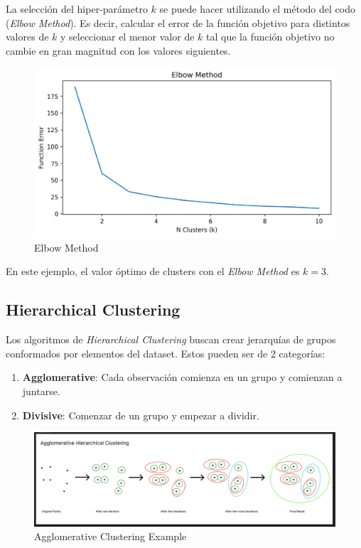 La selección del hiper-parámetro $k$ se puede hacer utilizando el método del codo (\textit{Elbow Method}). Es decir, calcular el error de la función objetivo para distintos valores de $k$ y seleccionar el menor valor de $k$ tal que la función objetivo no cambie en gran magnitud con los valores siguientes. 

\begin{figure}[H]
    \center
    \includegraphics[scale=0.45]{notebooks/ML/img/elbow_method_k_means.png}
    \caption{Elbow Method}
\end{figure}

En este ejemplo, el valor óptimo de clusters con el \textit{Elbow Method} es $k=3$.  

\subsection{Hierarchical Clustering}

Los algoritmos de \textit{Hierarchical Clustering} buscan crear jerarquías de grupos conformados por elementos del dataset. Estos pueden ser de 2 categorías: 

\begin{enumerate}
    \item \textbf{Agglomerative}: Cada observación comienza en un grupo y comienzan a juntarse. 
    \item \textbf{Divisive}: Comenzar de un grupo y empezar a dividir.
\end{enumerate}

\begin{figure}[H]
    \center
    \includegraphics[scale=0.25]{notebooks/ML/img/agg_clustering.png}
    \caption{Agglomerative Clustering Example}
\end{figure}

